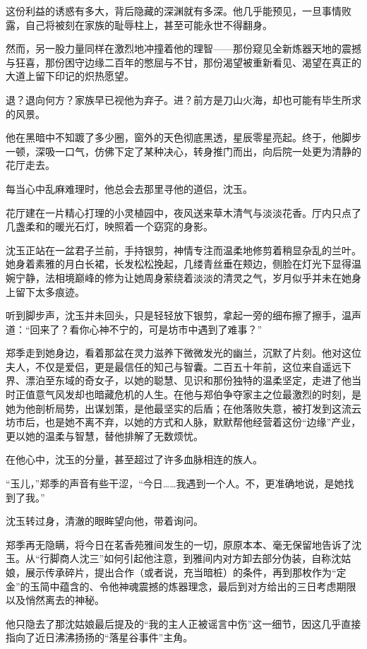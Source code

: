 这份利益的诱惑有多大，背后隐藏的深渊就有多深。他几乎能预见，一旦事情败露，自己将被刻在家族的耻辱柱上，甚至可能永世不得翻身。

然而，另一股力量同样在激烈地冲撞着他的理智——那份窥见全新炼器天地的震撼与狂喜，那份困守边缘二百年的憋屈与不甘，那份渴望被重新看见、渴望在真正的大道上留下印记的炽热愿望。

退？退向何方？家族早已视他为弃子。进？前方是刀山火海，却也可能有毕生所求的风景。

他在黑暗中不知踱了多少圈，窗外的天色彻底黑透，星辰零星亮起。终于，他脚步一顿，深吸一口气，仿佛下定了某种决心，转身推门而出，向后院一处更为清静的花厅走去。

每当心中乱麻难理时，他总会去那里寻他的道侣，沈玉。

花厅建在一片精心打理的小灵植园中，夜风送来草木清气与淡淡花香。厅内只点了几盏柔和的暖光石灯，映照着一个窈窕的身影。

沈玉正站在一盆君子兰前，手持银剪，神情专注而温柔地修剪着稍显杂乱的兰叶。她身着素雅的月白长裙，长发松松挽起，几缕青丝垂在颊边，侧脸在灯光下显得温婉宁静，法相境巅峰的修为让她周身萦绕着淡淡的清灵之气，岁月似乎并未在她身上留下太多痕迹。

听到脚步声，沈玉并未回头，只是轻轻放下银剪，拿起一旁的细布擦了擦手，温声道：“回来了？看你心神不宁的，可是坊市中遇到了难事？”

郑季走到她身边，看着那盆在灵力滋养下微微发光的幽兰，沉默了片刻。他对这位夫人，不仅是爱侣，更是最信任的知己与智囊。二百五十年前，这位来自遥远下界、漂泊至东域的奇女子，以她的聪慧、见识和那份独特的温柔坚定，走进了他当时正值意气风发却也暗藏危机的人生。在他与郑伯争夺家主之位最激烈的时刻，是她为他剖析局势，出谋划策，是他最坚实的后盾；在他落败失意，被打发到这流云坊市后，也是她不离不弃，以她的方式和人脉，默默帮他经营着这份“边缘”产业，更以她的温柔与智慧，替他排解了无数烦忧。

在他心中，沈玉的分量，甚至超过了许多血脉相连的族人。

“玉儿，”郑季的声音有些干涩，“今日……我遇到一个人。不，更准确地说，是她找到了我。”

沈玉转过身，清澈的眼眸望向他，带着询问。

郑季再无隐瞒，将今日在茗香苑雅间发生的一切，原原本本、毫无保留地告诉了沈玉。从“行脚商人沈三”如何引起他注意，到雅间内对方卸去部分伪装，自称沈姑娘，展示传承碎片，提出合作（或者说，充当暗桩）的条件，再到那枚作为“定金”的玉简中蕴含的、令他神魂震撼的炼器理念，最后到对方给出的三日考虑期限以及悄然离去的神秘。

他只隐去了那沈姑娘最后提及的“我的主人正被谣言中伤”这一细节，因这几乎直接指向了近日沸沸扬扬的“落星谷事件”主角。

